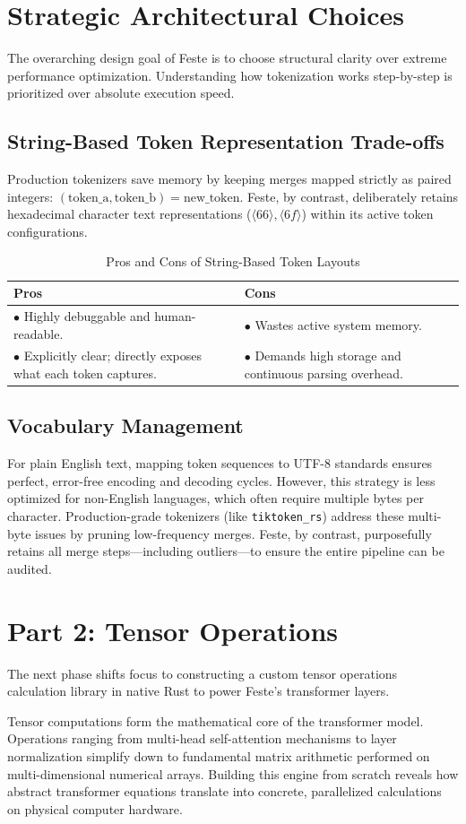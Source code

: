 \documentclass{article}
\begin{document}
\section{Strategic Architectural Choices}
The overarching design goal of Feste is to choose structural clarity over extreme performance optimization. Understanding how tokenization works step-by-step is prioritized over absolute execution speed.

\subsection{String-Based Token Representation Trade-offs}
Production tokenizers save memory by keeping merges mapped strictly as paired integers: $(\text{token\_a}, \text{token\_b}) = \text{new\_token}$. Feste, by contrast, deliberately retains hexadecimal character text representations ($\langle 66 \rangle, \langle 6f \rangle$) within its active token configurations.

\begin{table}[h!]
\centering
\caption{Pros and Cons of String-Based Token Layouts}
\label{tab:pros_cons_strings}
\begin{tabular}{p{} p{}}
\toprule
\textbf{Pros} & \textbf{Cons} \\
\midrule
$\bullet$ Highly debuggable and human-readable. & $\bullet$ Wastes active system memory. \\
$\bullet$ Explicitly clear; directly exposes what each token captures. & $\bullet$ Demands high storage and continuous parsing overhead. \\
\bottomrule
\end{tabular}
\end{table}

\subsection{Vocabulary Management}
For plain English text, mapping token sequences to UTF-8 standards ensures perfect, error-free encoding and decoding cycles. However, this strategy is less optimized for non-English languages, which often require multiple bytes per character. Production-grade tokenizers (like \texttt{tiktoken\_rs}) address these multi-byte issues by pruning low-frequency merges. Feste, by contrast, purposefully retains all merge steps---including outliers---to ensure the entire pipeline can be audited.

\section{Part 2: Tensor Operations}
The next phase shifts focus to constructing a custom tensor operations calculation library in native Rust to power Feste's transformer layers. 

Tensor computations form the mathematical core of the transformer model. Operations ranging from multi-head self-attention mechanisms to layer normalization simplify down to fundamental matrix arithmetic performed on multi-dimensional numerical arrays. Building this engine from scratch reveals how abstract transformer equations translate into concrete, parallelized calculations on physical computer hardware.
\end{document}
